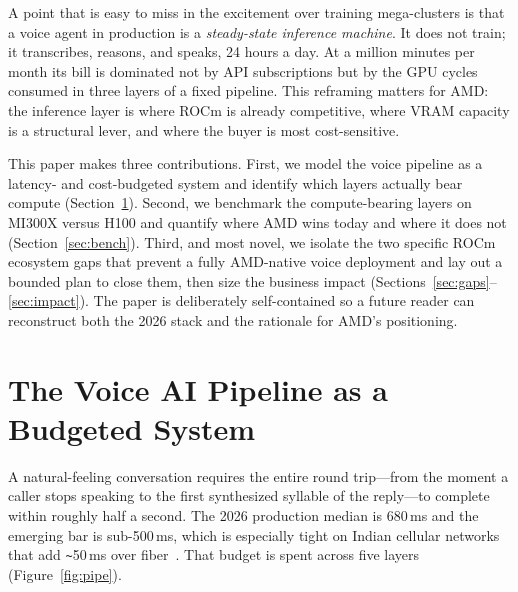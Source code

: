 \documentclass[blind]{gtac}
\begin{document}
A point that is easy to miss in the excitement over training mega-clusters is that a voice agent in production is a \emph{steady-state inference machine}. It does not train; it transcribes, reasons, and speaks, 24 hours a day. At a million minutes per month its bill is dominated not by API subscriptions but by the GPU cycles consumed in three layers of a fixed pipeline. This reframing matters for AMD: the inference layer is where ROCm is already competitive, where VRAM capacity is a structural lever, and where the buyer is most cost-sensitive.

This paper makes three contributions. First, we model the voice pipeline as a latency- and cost-budgeted system and identify which layers actually bear compute (Section~\ref{sec:pipeline}). Second, we benchmark the compute-bearing layers on MI300X versus H100 and quantify where AMD wins today and where it does not (Section~\ref{sec:bench}). Third, and most novel, we isolate the two specific ROCm ecosystem gaps that prevent a fully AMD-native voice deployment and lay out a bounded plan to close them, then size the business impact (Sections~\ref{sec:gaps}--\ref{sec:impact}). The paper is deliberately self-contained so a future reader can reconstruct both the 2026 stack and the rationale for AMD's positioning.

\section{The Voice AI Pipeline as a Budgeted System}
\label{sec:pipeline}
A natural-feeling conversation requires the entire round trip---from the moment a caller stops speaking to the first synthesized syllable of the reply---to complete within roughly half a second. The 2026 production median is 680\,ms and the emerging bar is sub-500\,ms, which is especially tight on Indian cellular networks that add \texttt{\textasciitilde}50\,ms over fiber~\cite{assemblyai_stack}. That budget is spent across five layers (Figure~\ref{fig:pipe}).
\end{document}
